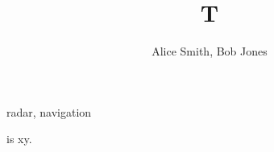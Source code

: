 \documentclass{ieeetj}
\title{T}
\author{Alice Smith\authorrefmark{1}, Bob Jones\authorrefmark{1}}
\affil{University A}
\begin{document}
\maketitle
\begin{IEEEkeywords}
radar, navigation
\end{IEEEkeywords}
 is \ifCLASSOPTIONcompsoc x\else y\fi.
\end{document}
